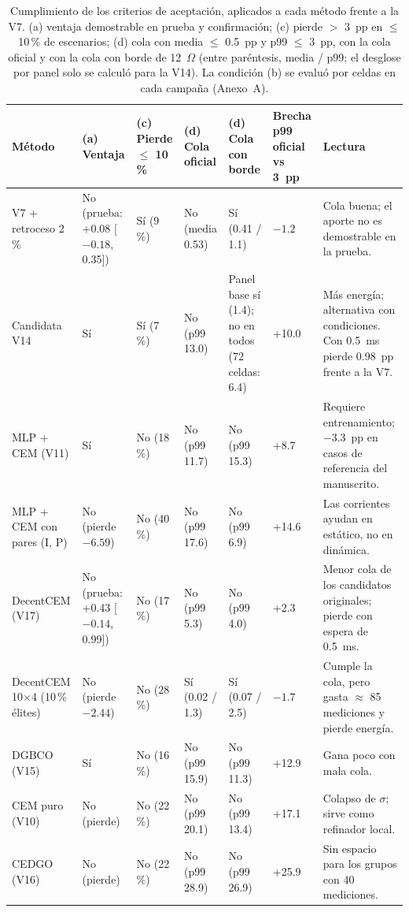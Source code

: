 \documentclass[letterpaper,11pt]{article}
\begin{document}
\begin{table}[H]
  \centering
  \caption{Cumplimiento de los criterios de aceptación, aplicados a cada método frente a la V7. (a) ventaja demostrable en prueba y confirmación; (c) pierde $>$ 3~pp en $\leq$ 10\,\% de escenarios; (d) cola con media $\leq$ 0.5~pp y p99 $\leq$ 3~pp, con la cola oficial y con la cola con borde de 12~$\Omega$ (entre paréntesis, media / p99; el desglose por panel solo se calculó para la V14). La condición (b) se evaluó por celdas en cada campaña (Anexo~A).}
  \label{tab:criterios}
  \scriptsize
  \begin{tabularx}{\linewidth}{@{}>{\raggedright\arraybackslash}p{2.2cm}>{\raggedright\arraybackslash}p{2.3cm}>{\raggedright\arraybackslash}p{1.25cm}>{\raggedright\arraybackslash}p{1.8cm}>{\raggedright\arraybackslash}p{2.2cm}>{\raggedright\arraybackslash}p{1.1cm}L@{}}
    \toprule
    \textbf{Método} & \textbf{(a) Ventaja} & \textbf{(c) Pierde $\leq$ 10\,\%} & \textbf{(d) Cola oficial} & \textbf{(d) Cola con borde} & \textbf{Brecha p99 oficial vs 3~pp} & \textbf{Lectura} \\
    \midrule
    V7 + retroceso 2\,\% & No (prueba: +0.08 [$-0.18$, 0.35]) & Sí (9\,\%) & No (media 0.53) & Sí (0.41 / 1.1) & $-1.2$ & Cola buena; el aporte no es demostrable en la prueba. \\
    Candidata V14 & Sí & Sí (7\,\%) & No (p99 13.0) & Panel base sí (1.4); no en todos (72 celdas: 6.4) & +10.0 & Más energía; alternativa con condiciones. Con 0.5~ms pierde 0.98~pp frente a la V7. \\
    MLP + CEM (V11) & Sí & No (18\,\%) & No (p99 11.7) & No (p99 15.3) & +8.7 & Requiere entrenamiento; $-3.3$~pp en casos de referencia del manuscrito. \\
    MLP + CEM con pares (I, P) & No (pierde $-6.59$) & No (40\,\%) & No (p99 17.6) & No (p99 6.9) & +14.6 & Las corrientes ayudan en estático, no en dinámica. \\
    DecentCEM (V17) & No (prueba: +0.43 [$-0.14$, 0.99]) & No (17\,\%) & No (p99 5.3) & No (p99 4.0) & +2.3 & Menor cola de los candidatos originales; pierde con espera de 0.5~ms. \\
    DecentCEM 10$\times$4 (10\,\% élites) & No (pierde $-2.44$) & No (28\,\%) & Sí (0.02 / 1.3) & Sí (0.07 / 2.5) & $-1.7$ & Cumple la cola, pero gasta $\approx$ 85 mediciones y pierde energía. \\
    DGBCO (V15) & Sí & No (16\,\%) & No (p99 15.9) & No (p99 11.3) & +12.9 & Gana poco con mala cola. \\
    CEM puro (V10) & No (pierde) & No (22\,\%) & No (p99 20.1) & No (p99 13.4) & +17.1 & Colapso de $\sigma$; sirve como refinador local. \\
    CEDGO (V16) & No (pierde) & No (22\,\%) & No (p99 28.9) & No (p99 26.9) & +25.9 & Sin espacio para los grupos con 40 mediciones. \\
    \bottomrule
  \end{tabularx}
\end{table}
\end{document}
